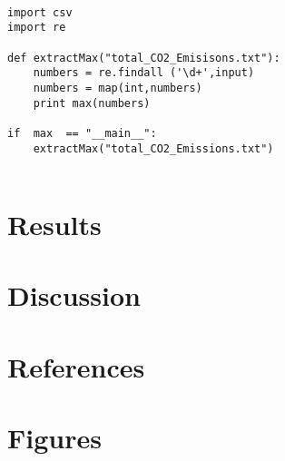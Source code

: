 \documentclass[letterpaper]{article}
\begin{document}
\lstset{language=Python}
\begin{lstlisting}[frame=single]

import csv
import re

def extractMax("total_CO2_Emisisons.txt"): 
	numbers = re.findall ('\d+',input)
	numbers = map(int,numbers) 
	print max(numbers) 
  
if  max  == "__main__": 
    extractMax("total_CO2_Emissions.txt")
    
\end{lstlisting}

\section{Results}

\section{Discussion}

\section{References}

\section{Figures}
\end{document}
